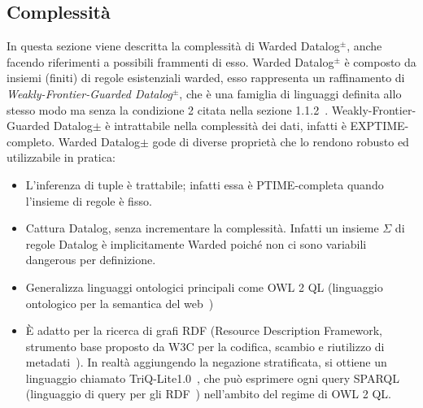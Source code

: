 \subsection{Complessità}

In questa sezione viene descritta la complessità di Warded Datalog$^\pm$, anche facendo riferimenti a possibili frammenti di esso. \newline
Warded Datalog$^\pm$ è composto da insiemi (finiti) di regole esistenziali warded, esso rappresenta un raffinamento di \textit{Weakly-Frontier-Guarded Datalog$^\pm$}, che è una famiglia di linguaggi definita allo stesso modo ma senza la condizione 2 citata nella sezione 1.1.2~\cite{baget2011rules}.
Weakly-Frontier-Guarded Datalog$\pm$ è intrattabile nella complessità dei dati, infatti è EXPTIME-completo. \newline \newline
Warded Datalog$\pm$ gode di diverse proprietà che lo rendono robusto ed utilizzabile in pratica:
\begin{itemize}
	\item L'inferenza di tuple è trattabile; infatti essa è PTIME-completa quando l'insieme di regole è fisso.
	\item Cattura Datalog, senza incrementare la complessità. Infatti un insieme $\Sigma$ di regole Datalog è implicitamente Warded poiché non ci sono variabili dangerous per definizione.
	\item Generalizza linguaggi ontologici principali come OWL 2 QL (linguaggio ontologico per la semantica del web~\cite{OWL2QL})
	\item È adatto per la ricerca di grafi RDF (Resource Description Framework, strumento base proposto da W3C per la codifica, scambio e riutilizzo di metadati~\cite{RDFW3C}). In realtà aggiungendo la negazione stratificata, si ottiene un linguaggio chiamato TriQ-Lite1.0~\cite{gottlob2015beyond}, che può esprimere ogni query SPARQL (linguaggio di query per gli RDF~\cite{SPARQLW3C}) nell'ambito del regime di OWL 2 QL.
\end{itemize}

